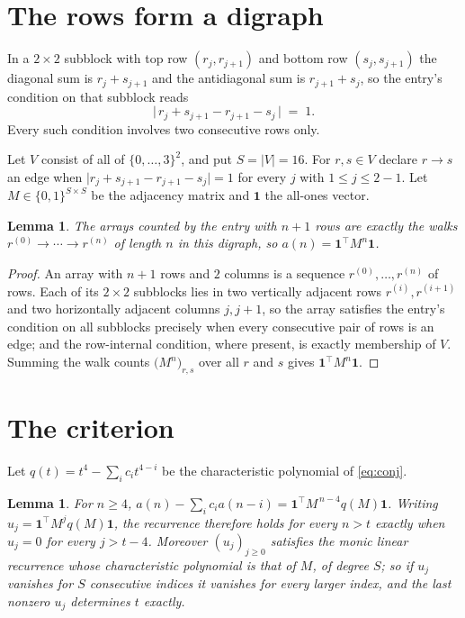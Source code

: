 \documentclass[11pt,a4paper]{article}
\theoremstyle{plain}
\newtheorem{lemma}[theorem]{Lemma}
\theoremstyle{definition}
\begin{document}
\section{The rows form a digraph}

In a $2\times2$ subblock with top row $(r_j,r_{j+1})$ and bottom row $(s_j,s_{j+1})$ the
diagonal sum is $r_j+s_{j+1}$ and the antidiagonal sum is $r_{j+1}+s_j$, so the entry's
condition on that subblock reads
\[
\bigl|\,r_j+s_{j+1}-r_{j+1}-s_j\,\bigr|\;=\;1.
\]
Every such condition involves two consecutive rows only.

Let $V$ consist of all of $\{0,\dots,3\}^{2}$, and put $S=|V|=16$. For $r,s\in V$ declare $r\to s$ an edge
when $\bigl|r_j+s_{j+1}-r_{j+1}-s_j\bigr|=1$ for every $j$ with
$1\le j\le2-1$. Let $M\in\{0,1\}^{S\times S}$ be the adjacency matrix and $\mathbf{1}$
the all-ones vector.

\begin{lemma}\label{lem:walk}
The arrays counted by the entry with $n+1$ rows are exactly the walks
$r^{(0)}\to\cdots\to r^{(n)}$ of length $n$ in this digraph, so
$a(n)=\mathbf{1}^{\!\top}M^{n}\mathbf{1}$.
\end{lemma}

\begin{proof}
An array with $n+1$ rows and $2$ columns is a sequence $r^{(0)},\dots,r^{(n)}$ of
rows. Each of its $2\times2$ subblocks lies in two vertically adjacent rows
$r^{(i)},r^{(i+1)}$ and two horizontally adjacent columns $j,j+1$, so the array satisfies
the entry's condition on all subblocks precisely when every consecutive pair of rows is an
edge; and the row-internal condition, where present, is exactly membership of $V$. Summing
the walk counts $\bigl(M^{n}\bigr)_{r,s}$ over all $r$ and $s$ gives
$\mathbf{1}^{\!\top}M^{n}\mathbf{1}$.
\end{proof}

\section{The criterion}

Let $q(t)=t^{4}-\sum_i c_i t^{4-i}$ be the characteristic polynomial of
\eqref{eq:conj}.

\begin{lemma}\label{lem:crit}
For $n\ge4$,
$a(n)-\sum_i c_i a(n-i)=\mathbf{1}^{\!\top}M^{\,n-4}q(M)\mathbf{1}$. Writing
$u_j=\mathbf{1}^{\!\top}M^{j}q(M)\mathbf{1}$, the recurrence therefore holds for every
$n>t$ exactly when $u_j=0$ for every $j>t-4$. Moreover $(u_j)_{j\ge0}$ satisfies the
monic linear recurrence whose characteristic polynomial is that of $M$, of degree $S$; so
if $u_j$ vanishes for $S$ consecutive indices it vanishes for every larger index, and the
last nonzero $u_j$ determines $t$ exactly.
\end{lemma}
\end{document}
